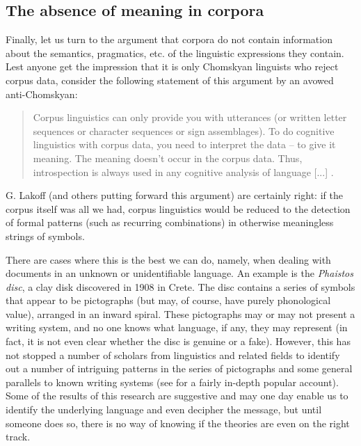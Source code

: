 \subsection{The absence of meaning in corpora}
\label{sec:absenceofmeaningincorpora}

Finally, let us turn to the argument that corpora do not contain information about the semantics, pragmatics, etc. of the linguistic expressions they contain. Lest anyone get the impression that it is only Chomskyan linguists who reject corpus data, consider the following statement of this argument by an avowed anti-Chomskyan: 

\begin{quote}
Corpus linguistics can only provide you with utterances (or written letter sequences or character sequences or sign assemblages). To do cognitive linguistics with corpus data, you need to interpret the data -- to give it meaning. The meaning doesn't occur in the corpus data. Thus, introspection is always used in any cognitive analysis of language [...] \citep{lakoff_re:_2004}.
\end{quote}

G. Lakoff (and others putting forward this argument) are certainly right: if the corpus itself was all we had, corpus linguistics would be reduced to the detection of formal patterns (such as recurring combinations) in otherwise meaningless strings of symbols. 

There are cases where this is the best we can do, namely, when dealing with documents in an unknown or unidentifiable language. An example is the \emph{Phaistos disc}, a clay disk discovered in 1908 in Crete. The disc contains a series of symbols that appear to be pictographs (but may, of course, have purely phonological value), arranged in an inward spiral. These pictographs may or may not present a writing system, and no one knows what language, if any, they may represent (in fact, it is not even clear whether the disc is genuine or a fake). However, this has not stopped a number of scholars from linguistics and related fields to identify out a number of intriguing patterns in the series of pictographs and some general parallels to known writing systems (see \citet[ch. 11]{robinson_lost_2002} for a fairly in-depth popular account). Some of the results of this research are suggestive and may one day enable us to identify the underlying language and even decipher the message, but until someone does so, there is no way of knowing if the theories are even on the right track.

